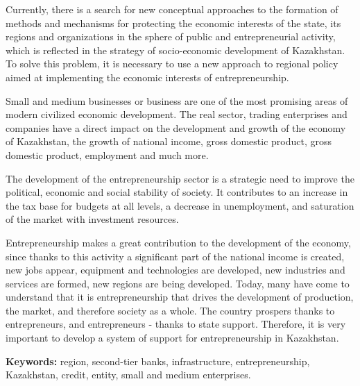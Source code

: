 Currently, there is a search for new conceptual approaches to the
formation of methods and mechanisms for protecting the economic
interests of the state, its regions and organizations in the sphere of
public and entrepreneurial activity, which is reflected in the strategy
of socio-economic development of Kazakhstan. To solve this problem, it
is necessary to use a new approach to regional policy aimed at
implementing the economic interests of entrepreneurship.

Small and medium businesses or business are one of the most promising
areas of modern civilized economic development. The real sector, trading
enterprises and companies have a direct impact on the development and
growth of the economy of Kazakhstan, the growth of national income,
gross domestic product, gross domestic product, employment and much
more.

The development of the entrepreneurship sector is a strategic need to
improve the political, economic and social stability of society. It
contributes to an increase in the tax base for budgets at all levels, a
decrease in unemployment, and saturation of the market with investment
resources.

Entrepreneurship makes a great contribution to the development of the
economy, since thanks to this activity a significant part of the
national income is created, new jobs appear, equipment and technologies
are developed, new industries and services are formed, new regions are
being developed. Today, many have come to understand that it is
entrepreneurship that drives the development of production, the market,
and therefore society as a whole. The country prospers thanks to
entrepreneurs, and entrepreneurs - thanks to state support. Therefore,
it is very important to develop a system of support for entrepreneurship
in Kazakhstan.

{\bfseries Keywords:} region, second-tier banks, infrastructure,
entrepreneurship, Kazakhstan, credit, entity, small and medium
enterprises.

